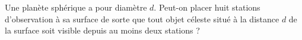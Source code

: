 Une planète sphérique a pour diamètre $d$. Peut-on placer huit stations d'observation à sa surface de sorte que tout objet céleste situé à la distance $d$ de la surface soit visible depuis au moins deux stations ?

